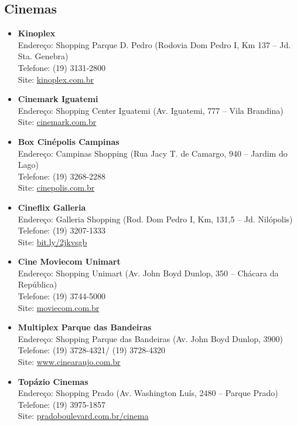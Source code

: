 \subsection{Cinemas}

\begin{itemize}
\item \textbf{Kinoplex}
  \\Endereço: Shopping Parque D. Pedro (Rodovia Dom Pedro I, Km 137 -- Jd. Sta.
  Genebra)
  \\Telefone: (19) 3131-2800
  \\Site: \url{kinoplex.com.br}

\item \textbf{Cinemark Iguatemi}
  \\Endereço: Shopping Center Iguatemi (Av. Iguatemi, 777 -- Vila Brandina)
  \\Site: \url{cinemark.com.br}

\item \textbf{Box Cinépolis Campinas}
  \\Endereço: Campinas Shopping (Rua Jacy T. de Camargo, 940 -- Jardim do Lago)
  \\Telefone: (19) 3268-2288
  \\Site: \url{cinepolis.com.br}

\item \textbf{Cineflix Galleria}
  \\Endereço: Galleria Shopping (Rod. Dom Pedro I, Km, 131,5 -- Jd. Nilópolis)
  \\Telefone: (19) 3207-1333
  \\Site: \url{bit.ly/2jkvsgb}

\item \textbf{Cine Moviecom Unimart}
  \\Endereço: Shopping Unimart (Av. John Boyd Dunlop, 350 -- Chácara da
  República)
  \\Telefone: (19) 3744-5000
  \\Site: \url{moviecom.com.br}

\item \textbf{Multiplex Parque das Bandeiras}
  \\Endereço: Shopping Parque das Bandeiras (Av. John Boyd Dunlop, 3900)
  \\Telefone: (19) 3728-4321/ (19) 3728-4320
  \\Site: \url{www.cinearaujo.com.br}

\item \textbf{Topázio Cinemas}
  \\Endereço: Shopping Prado (Av. Washington Luís, 2480 -- Parque Prado)
  \\Telefone: (19) 3975-1857
  \\Site: \url{pradoboulevard.com.br/cinema}
\end{itemize}

